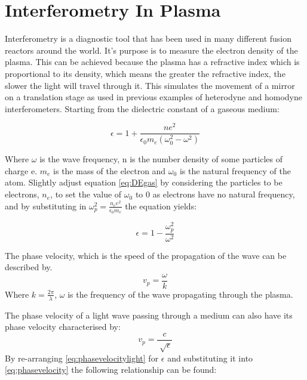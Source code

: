 \documentclass[12pt,a4paper,oneside]{report}
\begin{document}
    \section{Interferometry In Plasma}
Interferometry is a diagnostic tool that has been used in many different fusion reactors around the world. It's purpose is to measure the electron density of the plasma. This can be achieved because the plasma has a refractive index which is proportional to its density, which means the greater the refractive index, the slower the light will travel through it. This simulates the movement of a mirror on a translation stage as used in previous examples of heterodyne and homodyne interferometers. Starting from the dielectric constant of a gaseous medium:

\begin{equation}
\epsilon = 1 + \frac{ne^{2}}{\epsilon _{0} m_{e} (\omega _{0}^{2} - \omega ^{2})}
	\label{eq:DEgas}
\end{equation}

Where $\omega$ is the wave frequency, n is the number density of some particles of charge e. $m_{e}$ is the mass of the electron and $\omega _{0}$ is the natural frequency of the atom.
Slightly adjust equation \ref{eq:DEgas} by considering the particles to be electrons, $n_{e}$, to set the value of $\omega_{0}$ to 0 as electrons have no natural frequency, and by substituting in $\omega _{p}^{2} = \frac{n_{e}e^{2}}{\epsilon _{0} m_{e}}$ the equation yields:

\begin{equation}
\epsilon = 1 - \frac{\omega _{p}^{2}}{\omega ^{2}}
	\label{eq:DEgas}
\end{equation}

The phase velocity, which is the speed of the propagation of the wave can be described by.
\begin{equation}
v_{p} = \frac{\omega}{k}
	\label{eq:phasevelocity}
\end{equation}
Where $k = \frac{2\pi}{\lambda}$, $\omega$ is the frequency of the wave propagating through the plasma.

The phase velocity of a light wave passing through a medium can also have its phase velocity characterised by:
\begin{equation}
v_{p} = \frac{c}{\sqrt[]{\epsilon}}
	\label{eq:phasevelocitylight}
\end{equation}
By re-arranging \ref{eq:phasevelocitylight} for $\epsilon$ and substituting it into \ref{eq:phasevelocity} the following relationship can be found:
\end{document}
